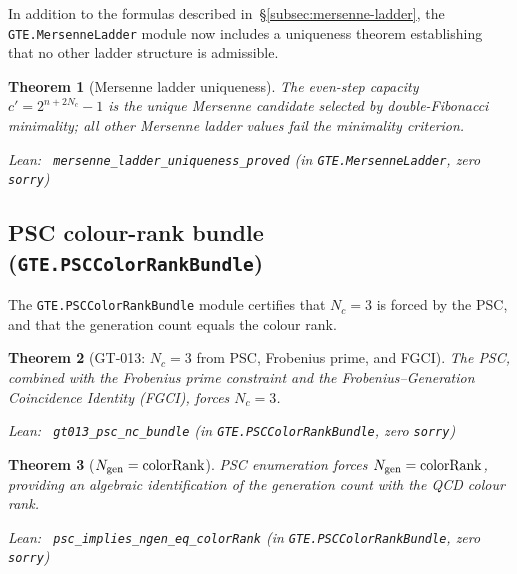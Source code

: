 \documentclass[11pt,a4paper]{article}
\newenvironment{leanref}%
  {\par\smallskip\noindent\begingroup\raggedright\textup{Lean:}~}%
  {\par\endgroup}
\newtheorem{theorem}{Theorem}[section]
\theoremstyle{definition}
\begin{document}
In addition to the formulas described in~\S\ref{subsec:mersenne-ladder}, the
\texttt{GTE.MersenneLadder} module now includes a uniqueness theorem establishing
that no other ladder structure is admissible.

\begin{theorem}[Mersenne ladder uniqueness]\label{thm:mersenne-unique}
The even-step capacity $c' = 2^{n + 2N_c} - 1$ is the \emph{unique} Mersenne
candidate selected by double-Fibonacci minimality; all other Mersenne ladder
values fail the minimality criterion.

\begin{leanref}
\lstinline|mersenne_ladder_uniqueness_proved|
\textup{(in \texttt{GTE.MersenneLadder}, zero \texttt{sorry})}
\end{leanref}
\end{theorem}

\subsection{PSC colour-rank bundle (\texttt{GTE.PSCColorRankBundle})}\label{subsec:psc-color-rank}

The \texttt{GTE.PSCColorRankBundle} module certifies that $N_c = 3$ is forced
by the PSC, and that the generation count equals the colour rank.

\begin{theorem}[GT-013: $N_c = 3$ from PSC, Frobenius prime, and FGCI]\label{thm:gt013-psc-nc}
The PSC, combined with the Frobenius prime constraint and the
Frobenius–Generation Coincidence Identity (FGCI), forces $N_c = 3$.

\begin{leanref}
\lstinline|gt013_psc_nc_bundle|
\textup{(in \texttt{GTE.PSCColorRankBundle}, zero \texttt{sorry})}
\end{leanref}
\end{theorem}

\begin{theorem}[$N_{\rm gen} = \mathrm{colorRank}$]\label{thm:ngen-color-rank}
PSC enumeration forces $N_{\rm gen} = \mathrm{colorRank}$, providing an algebraic
identification of the generation count with the QCD colour rank.

\begin{leanref}
\lstinline|psc_implies_ngen_eq_colorRank|
\textup{(in \texttt{GTE.PSCColorRankBundle}, zero \texttt{sorry})}
\end{leanref}
\end{theorem}
\end{document}
